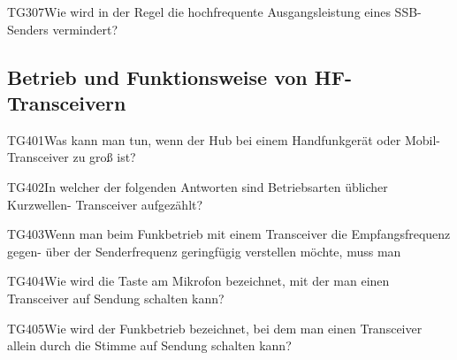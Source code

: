\begin{question}{TG307}{Wie wird in der Regel die hochfrequente Ausgangsleistung eines SSB-Senders vermindert?}
\end{question}

\subsection{Betrieb und Funktionsweise von HF-Transceivern}

\begin{question}{TG401}{Was kann man tun, wenn der Hub bei einem Handfunkgerät oder Mobil-Transceiver zu groß ist?}
\end{question}

\begin{question}{TG402}{In welcher der folgenden Antworten sind Betriebsarten üblicher Kurzwellen- Transceiver aufgezählt?}
\end{question}

\begin{question}{TG403}{Wenn man beim Funkbetrieb mit einem Transceiver die Empfangsfrequenz gegen- über der Senderfrequenz geringfügig verstellen möchte, muss man}
\end{question}

\begin{question}{TG404}{Wie wird die Taste am Mikrofon bezeichnet, mit der man einen Transceiver auf Sendung schalten kann?}
\end{question}

\begin{question}{TG405}{Wie wird der Funkbetrieb bezeichnet, bei dem man einen Transceiver allein durch die Stimme auf Sendung schalten kann?}
\end{question}

